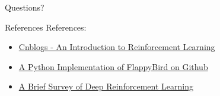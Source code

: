 \documentclass[10pt]{beamer}
\begin{document}
\begin{frame}[standout]
  Questions?
\end{frame}

\begin{frame}{References}
  References:
  \begin{itemize}
    \item \href{https://www.cnblogs.com/yifdu25/p/8169226.html}{Cnblogs - An Introduction to Reinforcement Learning}
    \item \href{https://github.com/yenchenlin/DeepLearningFlappyBird}{A Python Implementation of FlappyBird on Github}
    \item \href{https://arxiv.org/abs/1708.05866}{A Brief Survey of Deep Reinforcement Learning}
  \end{itemize}
\end{frame}
\end{document}
